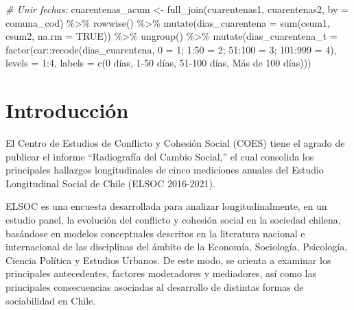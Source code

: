 \documentclass[
  12pt,
]{book}
\newenvironment{Shaded}{\begin{snugshade}}{\end{snugshade}}
\newcommand{\AttributeTok}[1]{\textcolor[rgb]{0.77,0.63,0.00}{#1}}
\newcommand{\CommentTok}[1]{\textcolor[rgb]{0.56,0.35,0.01}{\textit{#1}}}
\newcommand{\ConstantTok}[1]{\textcolor[rgb]{0.00,0.00,0.00}{#1}}
\newcommand{\DecValTok}[1]{\textcolor[rgb]{0.00,0.00,0.81}{#1}}
\newcommand{\FunctionTok}[1]{\textcolor[rgb]{0.00,0.00,0.00}{#1}}
\newcommand{\NormalTok}[1]{#1}
\newcommand{\OtherTok}[1]{\textcolor[rgb]{0.56,0.35,0.01}{#1}}
\newcommand{\SpecialCharTok}[1]{\textcolor[rgb]{0.00,0.00,0.00}{#1}}
\newcommand{\StringTok}[1]{\textcolor[rgb]{0.31,0.60,0.02}{#1}}
\begin{document}
\begin{Shaded}
\begin{Highlighting}[]
\CommentTok{\# Unir fechas:}
\NormalTok{cuarentenas\_acum }\OtherTok{\textless{}{-}} \FunctionTok{full\_join}\NormalTok{(cuarentenas1,}
\NormalTok{                              cuarentenas2,}
                              \AttributeTok{by =} \StringTok{\textquotesingle{}comuna\_cod\textquotesingle{}}\NormalTok{) }\SpecialCharTok{\%\textgreater{}\%} 
  \FunctionTok{rowwise}\NormalTok{() }\SpecialCharTok{\%\textgreater{}\%} 
  \FunctionTok{mutate}\NormalTok{(}\AttributeTok{dias\_cuarentena =} \FunctionTok{sum}\NormalTok{(csum1, csum2, }\AttributeTok{na.rm =} \ConstantTok{TRUE}\NormalTok{)) }\SpecialCharTok{\%\textgreater{}\%} 
  \FunctionTok{ungroup}\NormalTok{() }\SpecialCharTok{\%\textgreater{}\%} 
  \FunctionTok{mutate}\NormalTok{(}\AttributeTok{dias\_cuarentena\_t =} \FunctionTok{factor}\NormalTok{(car}\SpecialCharTok{::}\FunctionTok{recode}\NormalTok{(dias\_cuarentena, }\StringTok{\textquotesingle{}0 = 1; 1:50 = 2; 51:100 = 3; 101:999 = 4\textquotesingle{}}\NormalTok{),}
                                    \AttributeTok{levels =} \DecValTok{1}\SpecialCharTok{:}\DecValTok{4}\NormalTok{,}
                                    \AttributeTok{labels =} \FunctionTok{c}\NormalTok{(}\StringTok{\textquotesingle{}0 días\textquotesingle{}}\NormalTok{, }\StringTok{\textquotesingle{}1{-}50 días\textquotesingle{}}\NormalTok{, }\StringTok{\textquotesingle{}51{-}100 días\textquotesingle{}}\NormalTok{, }\StringTok{\textquotesingle{}Más de 100 días\textquotesingle{}}\NormalTok{))) }
\end{Highlighting}
\end{Shaded}

\hypertarget{introducciuxf3n}{%
\chapter{Introducción}\label{introducciuxf3n}}

El Centro de Estudios de Conflicto y Cohesión Social (COES) tiene el agrado de publicar el informe ``Radiografía del Cambio Social,'' el cual consolida los principales hallazgos longitudinales de cinco mediciones anuales del Estudio Longitudinal Social de Chile (ELSOC 2016-2021).

ELSOC es una encuesta desarrollada para analizar longitudinalmente, en un estudio panel, la evolución del conflicto y cohesión social en la sociedad chilena, basándose en modelos conceptuales descritos en la literatura nacional e internacional de las disciplinas del ámbito de la Economía, Sociología, Psicología, Ciencia Política y Estudios Urbanos. De este modo, se orienta a examinar los principales antecedentes, factores moderadores y mediadores, así como las principales consecuencias asociadas al desarrollo de distintas formas de sociabilidad en Chile.
\end{document}
